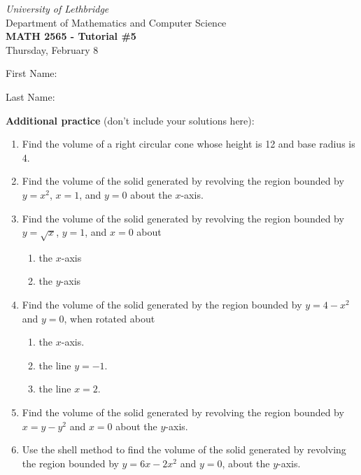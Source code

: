 \documentclass[12pt]{article}
\newcommand{\skipline}{\vspace{12pt}}
\begin{document}
\author{Instructor: Sean Fitzpatrick}
\thispagestyle{empty}
\begin{center}
\emph{University of Lethbridge}\\
Department of Mathematics and Computer Science\\
{\bf MATH 2565 - Tutorial \#5}\\
Thursday, February 8
\end{center}
\skipline \skipline \skipline \noindent \skipline

\skipline
First Name:\underline{\hspace{348pt}}\\
\skipline

\vspace{1cm}

Last Name:\underline{\hspace{351pt}}



\vspace{2cm}




\textbf{Additional practice} (don't include your solutions here):
\begin{enumerate}
 \item Find the volume of a right circular cone whose height is 12 and base radius is 4.
 \item Find the volume of the solid generated by revolving the region bounded by $y=x^2$, $x=1$, and $y=0$ about the $x$-axis.
 \item Find the volume of the solid generated by revolving the region bounded by $y=\sqrt{x}$, $y=1$, and $x=0$ about
 \begin{multicols}{2}
 \begin{enumerate}
 \item the $x$-axis
 \item the $y$-axis
\end{enumerate} 
\end{multicols}
 \item Find the volume of the solid generated by the region bounded by $y=4-x^2$ and $y=0$, when rotated about
 \begin{multicols}{3}
\begin{enumerate}
 \item the $x$-axis.
 \item the line $y=-1$.
 \item the line $x=2$.
\end{enumerate}
\end{multicols}
 \item Find the volume of the solid generated by revolving the region bounded by $x=y-y^2$ and $x=0$ about the $y$-axis.
 \item Use the shell method to find the volume of the solid generated by revolving the region bounded by $y=6x-2x^2$ and $y=0$, about the $y$-axis.


\end{enumerate}
\end{document}
